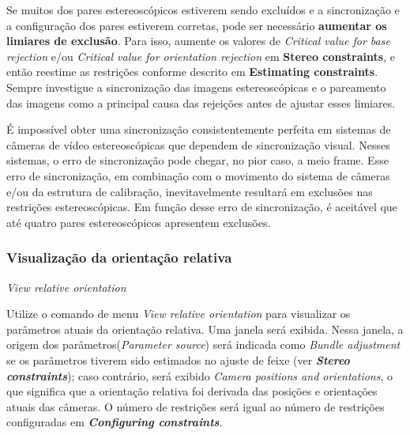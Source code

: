 \documentclass[
  12pt,
  letterpaper,
  DIV=11,
  numbers=noendperiod]{scrreprt}
\begin{document}
Se muitos dos pares estereoscópicos estiverem sendo excluídos e a
sincronização e a configuração dos pares estiverem corretas, pode ser
necessário \textbf{aumentar os limiares de exclusão}. Para isso, aumente
os valores de \emph{Critical value for base rejection} e/ou
\emph{Critical value for orientation rejection} em \textbf{Stereo
constraints}, e então reestime as restrições conforme descrito em
\textbf{Estimating constraints}. Sempre investigue a sincronização das
imagens estereoscópicas e o pareamento das imagens como a principal
causa das rejeições antes de ajustar esses limiares.

\begin{tcolorbox}[enhanced jigsaw, colframe=quarto-callout-note-color-frame, toprule=.15mm, opacitybacktitle=0.6, opacityback=0, bottomtitle=1mm, colback=white, coltitle=black, left=2mm, toptitle=1mm, titlerule=0mm, leftrule=.75mm, title=\textcolor{quarto-callout-note-color}{\faInfo}\hspace{0.5em}{Note}, rightrule=.15mm, arc=.35mm, breakable, bottomrule=.15mm, colbacktitle=quarto-callout-note-color!10!white]

É impossível obter uma sincronização consistentemente perfeita em
sistemas de câmeras de vídeo estereoscópicas que dependem de
sincronização visual. Nesses sistemas, o erro de sincronização pode
chegar, no pior caso, a meio frame. Esse erro de sincronização, em
combinação com o movimento do sistema de câmeras e/ou da estrutura de
calibração, inevitavelmente resultará em exclusões nas restrições
estereoscópicas. Em função desse erro de sincronização, é aceitável que
até quatro pares estereoscópicos apresentem exclusões.

\end{tcolorbox}

\subsubsection{\texorpdfstring{\textbf{Visualização da orientação
relativa}}{Visualização da orientação relativa}}\label{vis.rel.orient}

\emph{View relative orientation}

Utilize o comando de menu \emph{View relative orientation} para
visualizar os parâmetros atuais da orientação relativa. Uma janela será
exibida. Nessa janela, a origem dos parâmetros(\emph{Parameter source})
será indicada como \emph{Bundle adjustment} se os parâmetros tiverem
sido estimados no ajuste de feixe (ver \textbf{\emph{Stereo
constraints}}); caso contrário, será exibido \emph{Camera positions and
orientations}, o que significa que a orientação relativa foi derivada
das posições e orientações atuais das câmeras. O número de restrições
será igual ao número de restrições configuradas em
\textbf{\emph{Configuring constraints}}.
\end{document}
